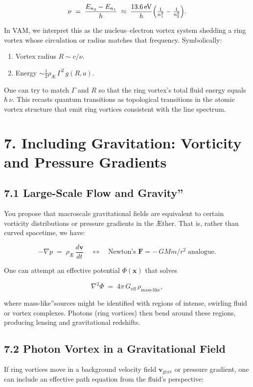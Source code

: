 \[
 \nu \;=\; \frac{E_{n_2}-E_{n_1}}{h} \;\approx\; \frac{13.6\,\mathrm{eV}}{h} \Bigl(\tfrac{1}{n_1^2}-\tfrac{1}{n_2^2}\Bigr).
\]

In VAM, we interpret this as the nucleus–electron vortex system shedding a ring vortex whose circulation or radius matches that frequency. Symbolically:

\begin{enumerate}
 \item Vortex radius \(R \sim c/\nu\).
 \item Energy \(\sim \tfrac12 \rho_{\scriptscriptstyle\mathrm{Æ}}\,\Gamma^2\,g(R,a)\).
\end{enumerate}

One can try to match \(\Gamma\) and \(R\) so that the ring vortex's total fluid energy equals \(\hbar\,\nu\). This recasts quantum transitions as topological transitions in the atomic vortex structure that emit ring vortices consistent with the line spectrum.

\section*{7. Including Gravitation: Vorticity and Pressure Gradients}
\subsection*{7.1 Large-Scale Flow and \grqq Gravity\textquotedblright}
You propose that macroscale gravitational fields are equivalent to certain vorticity distributions or pressure gradients in the Æther. That is, rather than curved spacetime, we have:

\[
 -\nabla p \;=\; \rho_{\scriptscriptstyle \mathrm{Æ}}\, \frac{d\mathbf{v}}{dt} \quad\longleftrightarrow\quad \text{Newton's } \mathbf{F}=-\,GMm/r^2\;\text{analogue}.
\]

One can attempt an effective potential \(\Phi(\mathbf{x})\) that solves

\[
 \nabla^2 \Phi \;=\; 4\pi\,G_\text{eff}\,\rho_\text{mass-like},
\]

where \grqq mass-like\textquotedblright sources might be identified with regions of intense, swirling fluid or vortex complexes. Photons (ring vortices) then bend around these regions, producing lensing and gravitational redshifts.

\subsection*{7.2 Photon Vortex in a Gravitational Field}
If ring vortices move in a background velocity field \(\mathbf{v}_{\mathrm{grav}}\) or pressure gradient, one can include an effective path equation from the fluid's perspective:

